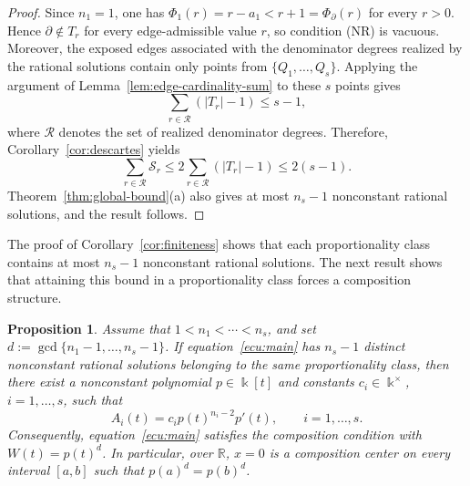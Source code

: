 \documentclass[12pt,a4paper]{amsart}
\numberwithin{theorem}{section}
\newtheorem{proposition}[theorem]{Proposition}
\theoremstyle{definition}
\begin{document}
	\begin{proof}
		Since $n_1=1$, one has $\Phi_1(r)=r-a_1<r+1=\Phi_\partial(r)$ for every $r>0$. Hence $\partial\notin T_r$ for every edge-admissible value $r$, so condition {\rm (NR)} is vacuous. Moreover, the exposed edges associated with the denominator degrees realized by the rational solutions contain only points from $\{Q_1,\ldots,Q_s\}$. Applying the argument of Lemma~\ref{lem:edge-cardinality-sum} to these $s$ points gives
		\[
		\sum_{r\in\mathcal R}(|T_r|-1)\leq s-1,
		\]
		where $\mathcal R$ denotes the set of realized denominator degrees. Therefore, Corollary~\ref{cor:descartes} yields
		\[
		\sum_{r\in\mathcal R}\mathcal S_r\leq2\sum_{r\in\mathcal R}(|T_r|-1)\leq2(s-1).
		\]
		Theorem~\ref{thm:global-bound}\textup{(a)} also gives at most $n_s-1$ nonconstant rational solutions, and the result follows.
	\end{proof}
	
	The proof of Corollary~\ref{cor:finiteness} shows that each proportionality class contains at most $n_s-1$ nonconstant rational solutions. The next result shows that attaining this bound in a proportionality class forces a composition structure.
	
	\begin{proposition}\label{prop:composition}
		Assume that $1<n_1<\cdots<n_s$, and set $d:=\gcd\{n_1-1,\ldots,n_s-1\}$. If equation~\eqref{ecu:main} has $n_s-1$ distinct nonconstant rational solutions belonging to the same proportionality class, then there exist a nonconstant polynomial $p\in\Bbbk[t]$ and constants $c_i\in\Bbbk^\times$, $i=1,\ldots,s$, such that
		\[
		A_i(t)=c_i p(t)^{n_i-2}p'(t),\qquad i=1,\ldots,s.
		\]
		Consequently, equation~\eqref{ecu:main} satisfies the composition condition with $W(t)=p(t)^d$. In particular, over $\mathbb{R}$, $x=0$ is a composition center on every interval $[a,b]$ such that $p(a)^d=p(b)^d$.
	\end{proposition}
	
\end{document}
